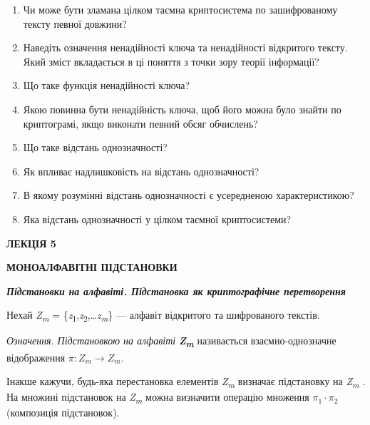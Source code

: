 \liststyleWWviiiNumx
\begin{enumerate}
\item Чи може бути зламана цілком таємна криптосистема по зашифрованому тексту
певної довжини?
\item Наведіть означення ненадійності ключа та ненадійності відкритого тексту.
Який зміст вкладається в ці поняття з точки зору теорії інформації?
\item Що таке функція ненадійності ключа?
\item Якою повинна бути ненадійність ключа, щоб його можна було знайти по
криптограмі, якщо виконати певний обсяг обчислень?
\item Що таке відстань однозначності?
\item Як впливає надлишковість на відстань однозначності?
\item В якому розумінні відстань однозначності є усередненою характеристикою?
\item Яка відстань однозначності у цілком таємної криптосистеми? 
\end{enumerate}

\bigskip


\bigskip


\bigskip

{\bfseries
ЛЕКЦІЯ  5}


\bigskip

{\centering\bfseries
МОНОАЛФАВІТНІ  ПІДСТАНОВКИ
\par}


\bigskip


\bigskip

{\centering\bfseries\itshape
Підстановки на алфавіті. Підстановка як криптографічне перетворення
\par}


\bigskip


\bigskip

Нехай \textit{Z}\textit{\textsubscript{m}} =
\{\textit{z}\textsubscript{1},\textit{z}\textsubscript{2},…\textit{z}\textit{\textsubscript{m}}\}
--- алфавіт відкритого та шифрованого текстів.

\textit{Означення.}\textit{ Підстановкою на алфавіті}\textbf{\textit{
}}\textbf{\textit{Z}}\textbf{\textit{\textsubscript{m}}} називається
взаємно-однозначне відображення  ${\pi :Z_{{m}}\rightarrow Z_{{m}}}$.

Інакше кажучи, будь-яка перестановка елементів
\textit{Z}\textit{\textsubscript{m}}\textsubscript{ } визначає підстановку на
\textit{Z}\textit{\textsubscript{m}}\textsubscript{ }. На множині підстановок
на \textit{Z}\textit{\textsubscript{m}} можна визначити операцію множення 
${\pi _{{1}}\cdot \pi _{{2}}}$ (композиція підстановок).

